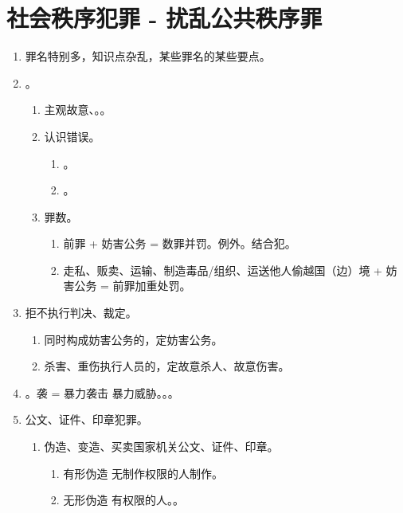 \section{社会秩序犯罪 - 扰乱公共秩序罪}
\begin{enumerate}
  \item 罪名特别多，知识点杂乱，某些罪名的某些要点。
  \item {}。
        \begin{enumerate}
          \item 主观故意、。。
          \item 认识错误。
                \begin{enumerate}
                  \item {}。
                  \item {}。
                \end{enumerate}
          \item 罪数。
                \begin{enumerate}
                  \item 前罪 + 妨害公务 = 数罪并罚。例外。结合犯。
                  \item 走私、贩卖、运输、制造毒品/组织、运送他人偷越国（边）境 + 妨害公务 = 前罪加重处罚。
                \end{enumerate}
        \end{enumerate}
  \item 拒不执行判决、裁定。
        \begin{enumerate}
          \item 同时构成妨害公务的，定妨害公务。
          \item 杀害、重伤执行人员的，定故意杀人、故意伤害。
        \end{enumerate}
  \item {}。\yi 袭 = 暴力袭击 \bdy 暴力威胁。。\er {}。
  \item 公文、证件、印章犯罪。
        \begin{enumerate}
          \item 伪造、变造、买卖国家机关公文、证件、印章。
                \begin{enumerate}
                  \item 有形伪造 \yjt 无制作权限的人制作。
                  \item 无形伪造 \yjt 有权限的人。。

\end{enumerate}
\end{enumerate}
\end{enumerate}
